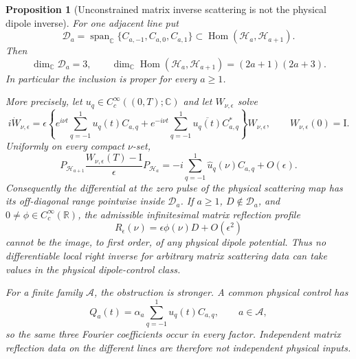 \documentclass[11pt]{article}
\newtheorem{proposition}[theorem]{Proposition}
\theoremstyle{remark}
\newcommand{\Id}{\mathrm I}
\begin{document}
\begin{proposition}[Unconstrained matrix inverse scattering is not the
physical dipole inverse]
\label{prop:matrix-zs-dipole-mismatch}
For one adjacent line put
\[
 \mathcal D_a
 =\operatorname{span}_{\mathbb C}
   \{C_{a,-1},C_{a,0},C_{a,1}\}
 \subset
 \operatorname{Hom}(\mathcal H_a,\mathcal H_{a+1}).
\]
Then
\begin{equation}
 \dim_{\mathbb C}\mathcal D_a=3,
 \qquad
 \dim_{\mathbb C}\operatorname{Hom}
   (\mathcal H_a,\mathcal H_{a+1})
 =(2a+1)(2a+3).
 \label{eq:dipole-zs-dimension-mismatch}
\end{equation}
In particular the inclusion is proper for every $a\geq1$.

More precisely, let $u_q\in C_c^\infty((0,T);\mathbb C)$ and let
$W_{\nu,\epsilon}$ solve
\begin{equation}
 i\dot W_{\nu,\epsilon}
 =\epsilon\left\{
 e^{i\nu t}\sum_{q=-1}^{1}u_q(t)C_{a,q}
 +e^{-i\nu t}\sum_{q=-1}^{1}\overline{u_q(t)}C_{a,q}^*
 \right\}W_{\nu,\epsilon},
 \qquad W_{\nu,\epsilon}(0)=\Id .
 \label{eq:physical-dipole-zs-line}
\end{equation}
Uniformly on every compact $\nu$-set,
\begin{equation}
 P_{\mathcal H_{a+1}}
 \frac{W_{\nu,\epsilon}(T)-\Id}{\epsilon}
 P_{\mathcal H_a}
 =
 -i\sum_{q=-1}^{1}\widehat u_q(\nu)C_{a,q}
 +O(\epsilon).
 \label{eq:dipole-scattering-first-born-range}
\end{equation}
Consequently the differential at the zero pulse of the physical scattering
map has its off-diagonal range pointwise inside $\mathcal D_a$.  If
$a\geq1$, $D\notin\mathcal D_a$, and
$0\neq\phi\in C_c^\infty(\mathbb R)$, the admissible infinitesimal matrix
reflection profile
\begin{equation}
 R_\epsilon(\nu)=\epsilon\phi(\nu)D+O(\epsilon^2)
 \label{eq:unconstrained-matrix-reflection-direction}
\end{equation}
cannot be the image, to first order, of any physical dipole potential.
Thus no differentiable local right inverse for arbitrary matrix scattering
data can take values in the physical dipole-control class.

For a finite family $\mathcal A$, the obstruction is stronger.  A common
physical control has
\begin{equation}
 Q_a(t)=\alpha_a\sum_{q=-1}^{1}u_q(t)C_{a,q},
 \qquad a\in\mathcal A,
 \label{eq:simultaneous-clebsch-potential-constraint}
\end{equation}
so the same three Fourier coefficients occur in every factor.  Independent
matrix reflection data on the different lines are therefore not independent
physical inputs.
\end{proposition}
\end{document}

